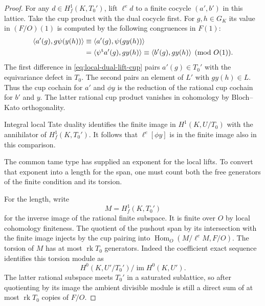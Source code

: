 \begin{proof}
For any
\(d\in H^1_f(K,T_0')\), lift \(\ell^e d\) to a finite
cocycle \((a',b')\) in this lattice. Take the cup product with the dual cocycle first.
For \(g,h\in G_K\) its value in \((F/O)(1)\) is computed by
the following congruences in \(F(1)\):
\begin{equation}\label{eq:local-dual-lift-cup}
 \begin{aligned}
 \langle a'(g),g\psi(y(h))\rangle
 &\equiv\langle a'(g),\psi(gy(h))\rangle\\
 &=\langle\psi^{\rm t}a'(g),gy(h)\rangle
 \equiv\langle b'(g),gy(h)\rangle \pmod{O(1)} .
 \end{aligned}
\end{equation}
The first difference in \eqref{eq:local-dual-lift-cup} pairs \(a'(g)\in T_0'\) with the
equivariance defect in \(T_0\). The second pairs an element of
\(L'\) with \(gy(h)\in L\). Thus the cup cochain for
\(a'\) and \(\phi y\) is the reduction of the rational cup
cochain for \(b'\) and \(y\). The latter rational
cup product vanishes in cohomology by Bloch--Kato
orthogonality.

Integral local Tate duality identifies the
finite image in \(H^1(K,U/T_0)\) with the annihilator of
\(H^1_f(K,T_0')\). It follows that \(\ell^e[\phi y]\)
is in the finite image also in this comparison.

The common tame type has supplied an exponent for the local lifts. To convert that exponent into a length for the span, one must count both the free generators of the finite condition and its torsion.

For the length, write
\[
 M=H^1_f(K,T_0')
\]
for the
inverse image of the rational finite subspace. It is
finite over \(O\) by local cohomology finiteness.
The quotient of the pushout span by its intersection
with the finite image injects by the cup pairing into
\(\operatorname{Hom}_O(M/\ell^e M,F/O)\).
The torsion of \(M\) has at most \(\operatorname{rk}T_0\)
generators. Indeed the coefficient exact sequence identifies this torsion module as
\[
 H^0(K,U'/T_0')/\operatorname{im}H^0(K,U').
\]
The latter rational subspace meets \(T_0'\)
in a saturated sublattice, so after quotienting by
its image the ambient divisible module is still a direct
sum of at most \(\operatorname{rk}T_0\) copies of \(F/O\).


\end{proof}
